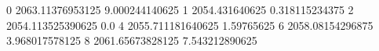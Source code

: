 0 2063.11376953125 9.000244140625
1 2054.431640625 0.318115234375
2 2054.113525390625 0.0
4 2055.711181640625 1.59765625
6 2058.08154296875 3.968017578125
8 2061.65673828125 7.543212890625
